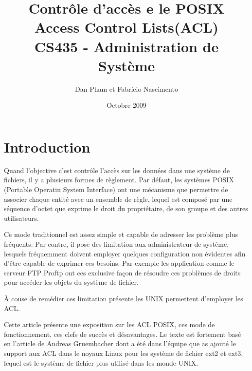 

\usepackage[francais]{babel}
\usepackage[utf8]{inputenc}

\usepackage{graphicx} 

\usepackage{algorithmic}
\usepackage{algorithm}


\title{\textbf{Contrôle d'accès e le POSIX Access Control Lists(ACL)} \\ CS435 - Administration de Système }
\author{Dan Pham et Fabrício Nascimento}
\date{Octobre 2009}



\maketitle
\newpage
\section*{Introduction}

Quand l'objective c'est contrôle l'accès sur les données dans une système de fichiers, il y a plusieurs formes de règlement. Par défaut, les systèmes POSIX (Portable Operatin System Interface)\cite{ieee1,ieee2} ont une mécanisme que permettre de associer chaque entité avec un ensemble de règle, lequel est composé par une séquence d'octet que exprime le droit du propriétaire, de son groupe et des autres utilisateurs. 

Ce mode traditionnel est assez simple et capable de adresser les problème plus fréquents. Par contre, il pose des limitation aux administrateur de système, lesquels fréquemment doivent employer quelques configuration non évidentes afin d'être capable de exprimer ces besoins. Par exemple les application comme le serveur FTP Proftp\cite{ftp} ont ces exclusive façon de résoudre ces problèmes de droits pour accéder les objets du système de fichier.

À couse de remédier ces limitation présente les UNIX permettent d'employer les ACL.   

Cette article présente une exposition sur les ACL POSIX, ces mode de fonctionnement, ces clefs de succès et désavantages. Le texte est fortement basé en l'article de Andreas Gruembacher\cite{aclsuse} dont a été dans l'équipe que as ajouté le support aux ACL dans le noyaux Linux pour les système de fichier ext2 et ext3, lequel est le système de fichier plus utilisé dans les monde UNIX.


